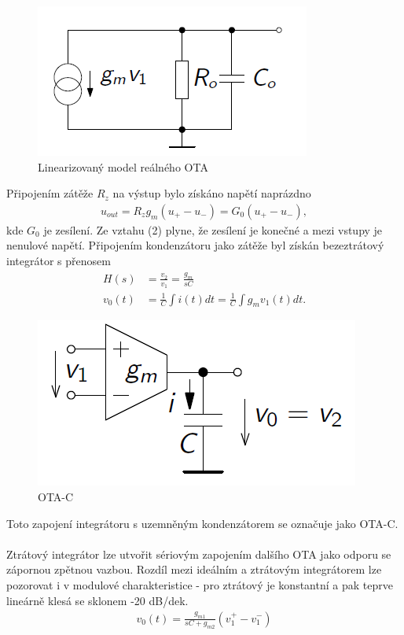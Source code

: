 \documentclass[twoside]{article}
\begin{document}
\begin{figure}[H]
\centering
\includegraphics[scale=0.6]{gmrc.png}
\caption{Linearizovaný model reálného OTA \cite{4}}
\end{figure}
\noindent Připojením zátěže $R_z$ na výstup bylo získáno napětí naprázdno
\begin{align}
u_{out} = R_zg_m(u_+ - u_-) = G_0(u_+ - u_-),
\end{align}
kde $G_0$ je zesílení. Ze vztahu (2) plyne, že zesílení je konečné a mezi vstupy je nenulové napětí. Připojením kondenzátoru jako zátěže byl získán bezeztrátový integrátor s přenosem
\begin{align}
H(s) &= \frac{v_2}{v_1} = \frac{g_m}{sC} \\
v_0(t) &= \frac{1}{C}\int i(t)dt = \frac{1}{C}\int g_mv_1(t)dt.
\end{align}
\begin{figure}[H]
\centering
\includegraphics[scale=0.5]{otaintegrator.png}
\caption{OTA-C \cite{4}}
\end{figure}
\noindent Toto zapojení integrátoru s uzemněným kondenzátorem se označuje jako OTA-C.\\
\\
Ztrátový integrátor lze utvořit sériovým zapojením dalšího OTA jako odporu se zápornou zpětnou vazbou. Rozdíl mezi ideálním a ztrátovým integrátorem lze pozorovat i v modulové charakteristice - pro ztrátový je konstantní a pak teprve lineárně klesá se sklonem -20 dB/dek.
\begin{align}
v_0(t) = \frac{g_{m1}}{sC + g_{m2}}(v_1^+ - v_{1}^-)
\end{align}
\end{document}
